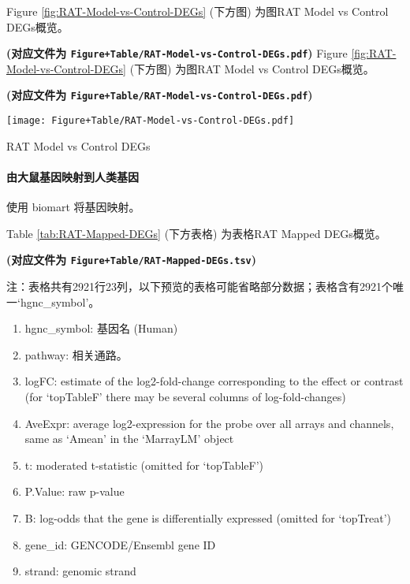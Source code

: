\documentclass[
]{article}
\providecommand{\tightlist}{%
  \setlength{\itemsep}{0pt}\setlength{\parskip}{0pt}}
\begin{document}
Figure \ref{fig:RAT-Model-vs-Control-DEGs} (下方图) 为图RAT Model vs Control DEGs概览。

\textbf{(对应文件为 \texttt{Figure+Table/RAT-Model-vs-Control-DEGs.pdf})}
Figure \ref{fig:RAT-Model-vs-Control-DEGs} (下方图) 为图RAT Model vs Control DEGs概览。

\textbf{(对应文件为 \texttt{Figure+Table/RAT-Model-vs-Control-DEGs.pdf})}

\def\@captype{figure}
\begin{center}
\texttt{[image: Figure+Table/RAT-Model-vs-Control-DEGs.pdf]}
\caption{RAT Model vs Control DEGs}\label{fig:RAT-Model-vs-Control-DEGs}
\end{center}

\hypertarget{ux7531ux5927ux9f20ux57faux56e0ux6620ux5c04ux5230ux4ebaux7c7bux57faux56e0}{%
\paragraph{由大鼠基因映射到人类基因}\label{ux7531ux5927ux9f20ux57faux56e0ux6620ux5c04ux5230ux4ebaux7c7bux57faux56e0}}

使用 biomart 将基因映射。

Table \ref{tab:RAT-Mapped-DEGs} (下方表格) 为表格RAT Mapped DEGs概览。

\textbf{(对应文件为 \texttt{Figure+Table/RAT-Mapped-DEGs.tsv})}

\begin{center}\begin{tcolorbox}[colback=gray!10, colframe=gray!50, width=0.9\linewidth, arc=1mm, boxrule=0.5pt]注：表格共有2921行23列，以下预览的表格可能省略部分数据；表格含有2921个唯一`hgnc\_symbol'。
\end{tcolorbox}
\end{center}
\begin{center}\begin{tcolorbox}[colback=gray!10, colframe=gray!50, width=0.9\linewidth, arc=1mm, boxrule=0.5pt]\begin{enumerate}\tightlist
\item hgnc\_symbol:  基因名 (Human)
\item pathway:  相关通路。
\item logFC:  estimate of the log2-fold-change corresponding to the effect or contrast (for ‘topTableF’ there may be several columns of log-fold-changes)
\item AveExpr:  average log2-expression for the probe over all arrays and channels, same as ‘Amean’ in the ‘MarrayLM’ object
\item t:  moderated t-statistic (omitted for ‘topTableF’)
\item P.Value:  raw p-value
\item B:  log-odds that the gene is differentially expressed (omitted for ‘topTreat’)
\item gene\_id:  GENCODE/Ensembl gene ID
\item strand:  genomic strand
\end{enumerate}\end{tcolorbox}
\end{center}
\end{document}
